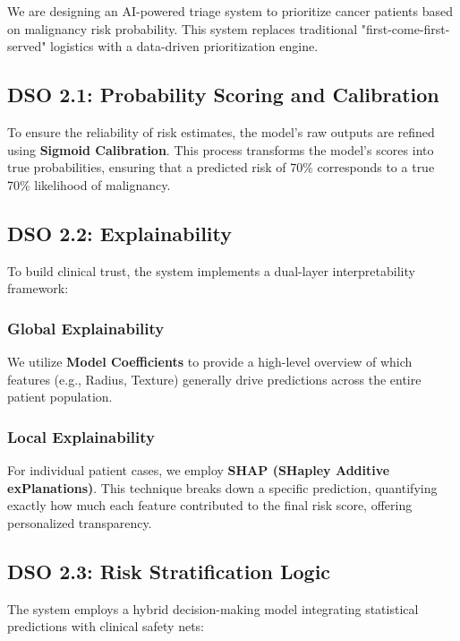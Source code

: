 \begin{infobox}[title=Context]
We are designing an AI-powered triage system to prioritize cancer patients based on malignancy risk probability. This system replaces traditional "first-come-first-served" logistics with a data-driven prioritization engine.
\end{infobox}

\subsection{DSO 2.1: Probability Scoring and Calibration}
To ensure the reliability of risk estimates, the model's raw outputs are refined using \textbf{Sigmoid Calibration}. This process transforms the model's scores into true probabilities, ensuring that a predicted risk of 70\% corresponds to a true 70\% likelihood of malignancy.

\subsection{DSO 2.2: Explainability}
To build clinical trust, the system implements a dual-layer interpretability framework:

\subsubsection{Global Explainability}
We utilize \textbf{Model Coefficients} to provide a high-level overview of which features (e.g., Radius, Texture) generally drive predictions across the entire patient population.

\subsubsection{Local Explainability}
For individual patient cases, we employ \textbf{SHAP (SHapley Additive exPlanations)}. This technique breaks down a specific prediction, quantifying exactly how much each feature contributed to the final risk score, offering personalized transparency.

\subsection{DSO 2.3: Risk Stratification Logic}
The system employs a hybrid decision-making model integrating statistical predictions with clinical safety nets:

